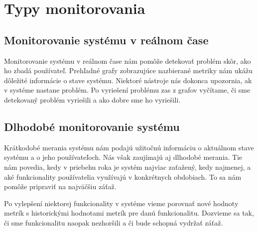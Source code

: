 \documentclass[a4paper, upjsfrontpage, disablespecwarning, thesismargins, thesislinespacing]{rnthesis}
\begin{document}
\chapter{Typy monitorovania}


\section{Monitorovanie systému v reálnom čase}

Monitorovanie systému v reálnom čase nám pomôže detekovať problém skôr, ako ho zbadá používateľ.
Prehľadné grafy zobrazujúce nazbierané metriky nám ukážu dôležité informácie o stave systému.
Niektoré nástroje nás dokonca upozornia, ak v systéme nastane problém.
Po vyriešení problému zas z grafov vyčítame, či sme detekovaný problém vyriešili a ako dobre sme ho vyriešili.


\section{Dlhodobé monitorovanie systému}

Krátkodobé merania systému nám podajú užitočnú informáciu o aktuálnom stave systému a o jeho používateľoch.
Nás však zaujímajú aj dlhodobé merania.
Tie nám povedia, kedy v priebehu roka je systém najviac zaťažený, kedy najmenej, a aké funkcionality používatelia využívajú v konkrétnych obdobiach.
To sa nám pomôže pripraviť na najväčšiu záťaž.

Po vylepšení niektorej funkcionality v systéme vieme porovnať nové hodnoty metrík s historickými hodnotami metrík pre danú funkcionalitu.
Dozvieme sa tak, či sme funkcionalitu naopak nezhoršili a či bude schopná vydržať záťaž.
\end{document}
